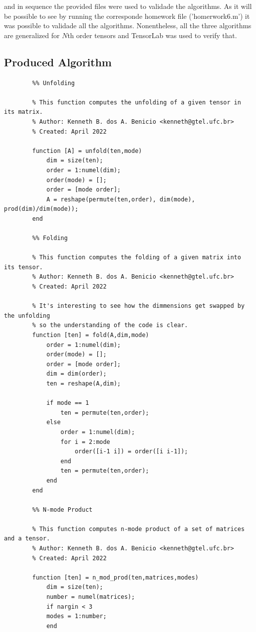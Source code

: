 \documentclass[a4paper,10pt]{article}
\begin{document}
    and in sequence the provided files were used to validade the algorithms. As it will be possible to see by running the corresponde homework file ('homerwork6.m') it was 
    possible to validade all the algorithms. Nonentheless, all the three algorithms are generalized for $N$th order tensors and TensorLab was used to verify that.

    \subsection*{Produced Algorithm}

    \begin{verbatim}
        %% Unfolding

        % This function computes the unfolding of a given tensor in its matrix.   
        % Author: Kenneth B. dos A. Benicio <kenneth@gtel.ufc.br>
        % Created: April 2022

        function [A] = unfold(ten,mode)
            dim = size(ten);
            order = 1:numel(dim);
            order(mode) = [];
            order = [mode order];
            A = reshape(permute(ten,order), dim(mode), prod(dim)/dim(mode));
        end

        %% Folding

        % This function computes the folding of a given matrix into its tensor.   
        % Author: Kenneth B. dos A. Benicio <kenneth@gtel.ufc.br>
        % Created: April 2022

        % It's interesting to see how the dimmensions get swapped by the unfolding
        % so the understanding of the code is clear.
        function [ten] = fold(A,dim,mode)
            order = 1:numel(dim);
            order(mode) = [];
            order = [mode order];
            dim = dim(order);
            ten = reshape(A,dim);
            
            if mode == 1
                ten = permute(ten,order);
            else
                order = 1:numel(dim);
                for i = 2:mode
                    order([i-1 i]) = order([i i-1]);
                end
                ten = permute(ten,order);
            end
        end

        %% N-mode Product

        % This function computes n-mode product of a set of matrices and a tensor.   
        % Author: Kenneth B. dos A. Benicio <kenneth@gtel.ufc.br>
        % Created: April 2022

        function [ten] = n_mod_prod(ten,matrices,modes)
            dim = size(ten);
            number = numel(matrices);
            if nargin < 3
            modes = 1:number; 
            end
            

\end{verbatim}
\end{document}
